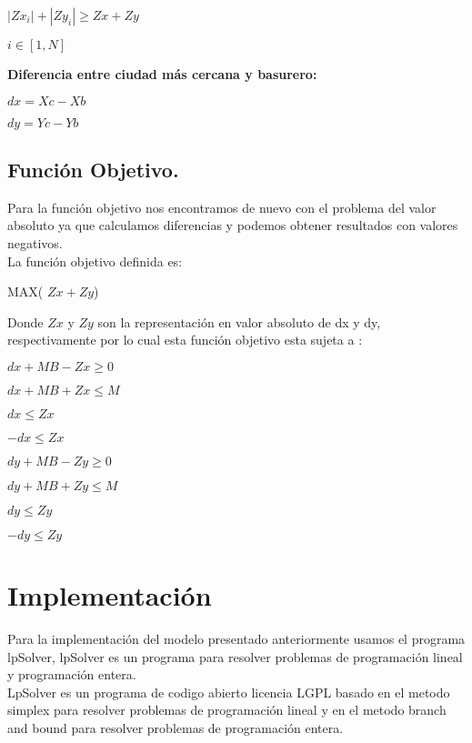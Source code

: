 \documentclass[10pt]{article}
\begin{document}
\begin{center}

 
  $ |Zx_i| + |Zy_i| \geq Zx + Zy $
  
   
   $i \in [1,N]$
  
  

\end{center}


\textbf{Diferencia entre ciudad  m\'as cercana y basurero: }\\

\begin{center}

 
  $ dx = Xc - Xb $
  
   
   $dy = Yc - Yb$
  
  

\end{center}


\subsection{Funci\'on Objetivo.}

Para la funci\'on objetivo nos encontramos de nuevo con el problema del valor absoluto ya que calculamos diferencias y podemos obtener resultados con valores negativos.\\

La función objetivo definida es: 

\begin{center}
      MAX( $Zx + Zy$)
\end{center}

Donde $Zx$ y $Zy$ son la representaci\'on en valor absoluto de dx y dy, respectivamente por lo cual esta funci\'on objetivo esta sujeta a : 

\begin{center}
$dx + MB - Zx \geq 0 $

$dx + MB + Zx \leq M $

$dx \leq Zx $

$-dx \leq Zx$

\end{center}


\begin{center}
$dy + MB - Zy \geq 0 $

$dy + MB + Zy \leq M $

$dy \leq Zy $

$-dy \leq Zy$

\end{center}

\section{Implementaci\'on}

Para la implementaci\'on del modelo presentado anteriormente usamos el programa lpSolver, lpSolver es un programa para resolver problemas de programación lineal y programación entera.\\

LpSolver es un programa de codigo abierto licencia LGPL basado en el metodo simplex para resolver problemas de programación lineal y en el metodo branch and bound para  resolver problemas de programaci\'on entera.
\end{document}
